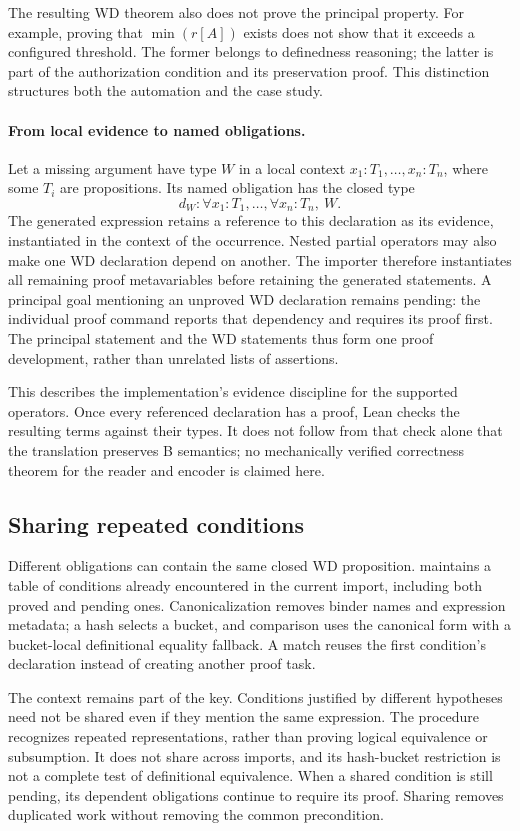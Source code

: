 The resulting WD theorem also does not prove the principal property.
For example, proving that $\min(r[A])$ exists does not show that it exceeds
a configured threshold. The former belongs to definedness reasoning;
the latter is part of the authorization condition and its preservation
proof. This distinction structures both the automation and the case study.

\paragraph{From local evidence to named obligations.}
Let a missing argument have type $W$ in a local context
$x_1:T_1,\ldots,x_n:T_n$, where some $T_i$ are propositions. Its named
obligation has the closed type
\[
  d_W:\forall x_1:T_1,\ldots,\forall x_n:T_n,\ W.
\]
The generated expression retains a reference to this declaration as its
evidence, instantiated in the context of the occurrence. Nested partial
operators may also make one WD declaration depend on another. The importer
therefore instantiates all remaining proof metavariables before retaining
the generated statements. A principal goal mentioning an unproved WD
declaration remains pending: the individual proof command reports that
dependency and requires its proof first. The principal statement and the
WD statements thus form one proof development, rather than unrelated
lists of assertions.

This describes the implementation's evidence discipline for the supported
operators. Once every referenced declaration has a proof, Lean checks the
resulting terms against their types. It does not follow from that check
alone that the translation preserves B semantics; no mechanically verified
correctness theorem for the reader and encoder is claimed here.

\subsection{Sharing repeated conditions}

Different obligations can contain the same closed WD proposition.
\barrel maintains a table of conditions already encountered in the
current import, including both proved and pending ones. Canonicalization
removes binder names and expression metadata; a hash selects a bucket,
and comparison uses the canonical form with a bucket-local definitional
equality fallback. A match reuses the first condition's declaration
instead of creating another proof task.

The context remains part of the key. Conditions justified by different
hypotheses need not be shared even if they mention the same expression.
The procedure recognizes repeated representations, rather than proving
logical equivalence or subsumption. It does not share across imports,
and its hash-bucket restriction is not a complete test of definitional
equivalence. When a shared condition is still pending, its dependent
obligations continue to require its proof. Sharing removes duplicated
work without removing the common precondition.
